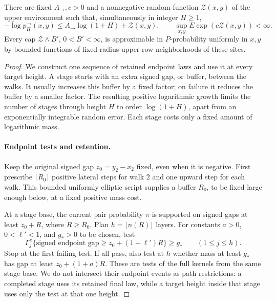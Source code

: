 \begin{proposition}\label{kernel-outward-order}
There are fixed \(A_{\to},c>0\) and a nonnegative random function
\(\mathcal Z(x,y)\) of the upper environment such that, simultaneously
in integer \(H\ge1\),
\[
-\log p_H^\to(x,y)\le A_{\to}\log(1+H)+\mathcal Z(x,y),\qquad
\sup_{x,y} E\exp(c\mathcal Z(x,y))<\infty.
\tag{33}\label{eq:33}
\]
Every cap \(\mathcal Z\wedge B'\), \(0<B'<\infty\), is approximable in \(P\)-probability uniformly in \(x,y\) by bounded functions of fixed-radius upper row neighborhoods of these sites.
\end{proposition}

\begin{proof}
We construct one sequence of retained endpoint laws and use it at every
target height. A stage starts with an extra signed gap, or buffer,
between the walks. It usually increases this buffer by a fixed factor;
on failure it reduces the buffer by a smaller factor. The resulting
positive logarithmic growth limits the number of stages through height
\(H\) to order \(\log(1+H)\), apart from an exponentially integrable
random error. Each stage costs only a fixed amount of logarithmic mass.

\paragraph{Endpoint tests and retention.}
Keep the original signed gap \(z_0=y_2-x_2\) fixed, even when it is
negative. First prescribe \(\lceil R_0\rceil\) positive lateral
steps for walk 2 and one upward step for each walk. This bounded
uniformly elliptic script supplies a buffer \(R_0\), to be fixed
large enough below, at a fixed positive mass cost.

At a stage base, the current pair probability \(\pi\) is supported
on signed gaps at least \(z_0+R\), where \(R\ge R_0\). Plan
\(h=\lfloor n(R)\rfloor\) layers. For constants
\(a>0\), \(0<\ell'<1\), and \(g_*>0\) to be chosen, test
\[
\Gamma_j^\pi\{\text{signed endpoint gap}\ge z_0+(1-\ell')R\}
   \ge g_*
\qquad(1\le j\le h).
\]
Stop at the first failing test. If all pass, also test at \(h\)
whether mass at least \(g_*\) has gap at least \(z_0+(1+a)R\).
These are tests of the full kernels from the same stage base. We do not
intersect their endpoint events as path restrictions: a completed stage
uses its retained final law, while a target height inside that stage
uses only the test at that one height.


\end{proof}
